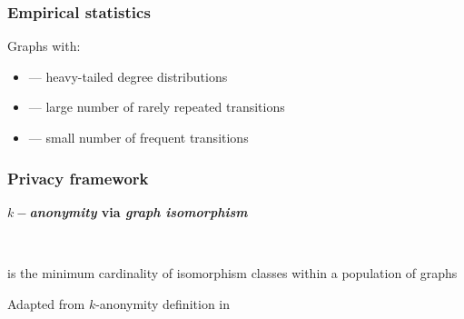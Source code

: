 \documentclass[hyperref={colorlinks = true},unknownkeysallowed]{beamer}
\let\oldcitep=\citep
\renewcommand\citep[1]{\hypersetup{linkcolor=UBCblue}\hyperlink{#1}{\oldcitep{#1}}}
\begin{document}
\begin{frame}
	\frametitle{Empirical statistics}
	Graphs with:
	\begin{itemize}
		\vspace{0.2cm}
		\item --- heavy-tailed degree distributions
		\vspace{0.2cm}
		\item --- large number of rarely repeated transitions
		\vspace{0.2cm}
		\item --- small number of frequent transitions
	\end{itemize}
\end{frame}


\begin{frame}
	\frametitle{Privacy framework}
	\begin{center}
	\textbf{\emph{$k-$anonymity}  via  \emph{graph isomorphism}}
	\end{center}\\
\begin{tcolorbox}[colback=green!5,colframe=white!40!black,title=Graph $k-$anonymity]  is the minimum  cardinality of isomorphism
	classes within a population of graphs\end{tcolorbox}
	\begin{flushright}
	Adapted from $k$-anonymity definition in~\Fontvi\citep{sweeney2002k}\hfill
\end{flushright}
\end{frame}
\end{document}
